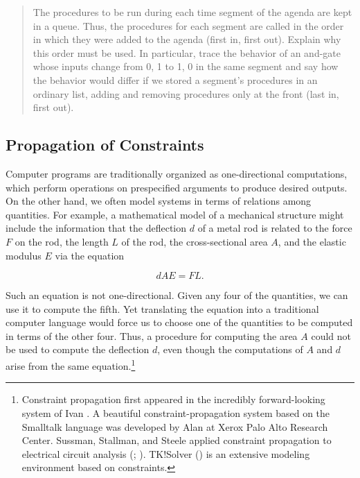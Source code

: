 \begin{quote}
 The procedures to be run during
each time segment of the agenda are kept in a queue.  Thus, the procedures for
each segment are called in the order in which they were added to the agenda
(first in, first out).  Explain why this order must be used.  In particular,
trace the behavior of an and-gate whose inputs change from 0, 1 to 1, 0 in the
same segment and say how the behavior would differ if we stored a segment's
procedures in an ordinary list, adding and removing procedures only at the
front (last in, first out).
\end{quote}


\subsection{Propagation of Constraints}
\label{Section 3.3.5}

Computer programs are traditionally organized as one-directional computations,
which perform operations on prespecified arguments to produce desired outputs.
On the other hand, we often model systems in terms of relations among
quantities.  For example, a mathematical model of a mechanical structure might
include the information that the deflection \( d \) of a metal rod is related to
the force \( F \) on the rod, the length \( L \) of the rod, the cross-sectional
area \( A \), and the elastic modulus \( E \) via the equation
\begin{comment}

\begin{example}
dAE = FL
\end{example}

\end{comment}

$$ dAE = FL. $$

Such an equation is not one-directional.  Given any four of the quantities, we
can use it to compute the fifth.  Yet translating the equation into a
traditional computer language would force us to choose one of the quantities to
be computed in terms of the other four.  Thus, a procedure for computing the
area \( A \) could not be used to compute the deflection \( d \), even though the
computations of \( A \) and \( d \) arise from the same
equation.\footnote{Constraint propagation first appeared in the incredibly
forward-looking  system of Ivan .  A
beautiful constraint-propagation system based on the Smalltalk language was
developed by Alan  at Xerox Palo Alto Research Center.  Sussman,
Stallman, and Steele applied constraint propagation to electrical circuit
analysis (; ). TK!Solver
() is an extensive modeling environment based on
constraints.}

